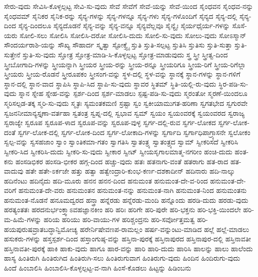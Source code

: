{ಸೇರು-ವುದು
ಸೇವಿಸಿ-ಕೊಳ್ಳಲ್ಪಟ್ಟ
ಸೇವಿ-ಸು-ವುದು
ಸೇವೆ
ಸೇವೆಗೆ
ಸೇವೆ-ಯನ್ನು
ಸೇವೆ-ಯಿಂದ
ಸೈಂಧವನ
ಸೈಂಧವ-ನನ್ನು
ಸೈಂಧವಮ್
ಸೈನಿಕರ
ಸೈನಿಕ-ರನ್ನು
ಸೈನ್ಯ-ಗಳನ್ನು
ಸೈನ್ಯ-ಗಳನ್ನೂ
ಸೈನ್ಯ-ಗಳು
ಸೈನ್ಯ-ಗಳೊಂದಿಗೆ
ಸೈನ್ಯದ
ಸೈನ್ಯ-ದಲ್ಲಿ
ಸೈನ್ಯ-ದಿಂದ
ಸೈನ್ಯ-ದಿಂದಲೂ
ಸೈನ್ಯದೊಡನೆ
ಸೈನ್ಯ-ವನ್ನು
ಸೈನ್ಯ-ವನ್ನೂ
ಸೈನ್ಯವೆಲ್ಲವೂ
ಸೈನ್ಯೈಃ
ಸೈರ್ಯಧೈರ್ಯ-ಗಳನ್ನು
ಸೊಸೆ-ಯರು
ಸೋಲಿ-ಸಲು
ಸೋಲಿಸಿ
ಸೋಲಿಸಿ-ದರೋ
ಸೋಲಿಸಿ-ದುದು
ಸೋಲಿ-ಸು-ವುದು
ಸೋಲು-ವುದು
ಸೋಽಸ್ಮಾನ್
ಸೌಂದರ್ಯರಾಶಿ-ಯನ್ನು
ಸೌಖ್ಯ
ಸೌಹಾರ್ದ
ಸ್ಕೃತ್ವಾ
ಸ್ಟೋಕ್ತ್ಯೈ
ಸ್ತುತಿ
ಸ್ತುತಿ-ಸಲ್ಪಟ್ಟ
ಸ್ತುತಿಸಿ
ಸ್ತುತಿಸು
ಸ್ತುತಿ-ಸುತ್ತಾ
ಸ್ತುತಿ-ಸುತ್ತೇನೆ
ಸ್ತುತಿ-ಸು-ವುದು
ಸ್ತೋತ್ರ
ಸ್ತೋತ್ರ-ಮಾಡಿ-ಸಿ-ಕೊಳ್ಳಲ್ಪಟ್ಟ
ಸ್ತೋತ್ರ-ಮಾಡುವುದು
ಸ್ತ್ರ
ಸ್ತ್ರೀ
ಸ್ತ್ರೀತ್ವ-ದಿಂದ
ಸ್ತ್ರೀಬೋಗಾದಿ-ಗಳನ್ನು
ಸ್ತ್ರೀಯನ್ನಾಗಿ
ಸ್ತ್ರೀಯರ
ಸ್ತ್ರೀಯ-ರನ್ನು
ಸ್ತ್ರೀಯ-ರನ್ನೂ
ಸ್ತ್ರೀಯರಿಗೂ
ಸ್ತ್ರೀಯ-ರಿಗೆ
ಸ್ತ್ರೀಯ-ರಿಗೆಲ್ಲಾ
ಸ್ತ್ರೀಯರು
ಸ್ತ್ರೀಯ-ರೊಡನೆ
ಸ್ತ್ರೀರೂಪಕಂ
ಸ್ತ್ರೀಸಂಗ-ವನ್ನು
ಸ್ಥಳ-ದಲ್ಲಿ
ಸ್ಥಳ-ವನ್ನು
ಸ್ಥಾನಕ್ಕೆ
ಸ್ಥಾನ-ಗಳನ್ನು
ಸ್ಥಾನ-ಗಳಿಗೆ
ಸ್ಥಾನ-ದಲ್ಲಿ
ಸ್ಥಾನ-ವಾದ
ಸ್ಥಾಪಿಸಿ
ಸ್ಥಾಪಿ-ಸಿದ
ಸ್ಥಾಪಿ-ಸು-ವುದು
ಸ್ಥಾವರ
ಸ್ಥಿತಮ್
ಸ್ಥಿತಿ-ಯಲ್ಲಿ-ರು-ವುದು
ಸ್ಥಿರ-ಪಡಿ-ಸು-ವುದು
ಸ್ನಾನ
ಸ್ನೇಹ
ಸ್ನೇಹ-ವನ್ನು
ಸ್ಪರ್ಶ-ದಿಂದ
ಸ್ಪರ್ಶ-ಮಾಡಲು
ಸ್ಪಷ್ಟ-ಪಡಿ-ಸು-ವುದು
ಸ್ಮರಂತೋ
ಸ್ಮರಣೆ-ಯಿಂದಲೂ
ಸ್ಮರಿಸಲ್ಪಡ-ತಕ್ಕ
ಸ್ಮರಿ-ಸು-ವುದು
ಸ್ಮೃತಃ
ಸ್ಯಮಂತಕಮಣಿ
ಸ್ರಷ್ಟಾ
ಸ್ವಂ
ಸ್ವಕೀಯಾಮುಗತ-ಹರಿಣಾ
ಸ್ವಗತಭೇದ
ಸ್ವಗುರವೇ
ಸ್ವಜನನೀಮಾನ್ಯಸ್ತೃಣಾ-ವರ್ತಹಾ
ಸ್ವತಂತ್ರ
ಸ್ವಪ್ನ-ದಲ್ಲಿ
ಸ್ವಭಾವ
ಸ್ವಮ್
ಸ್ವಯಂ
ಸ್ವಯಂವರಕ್ಕೆ
ಸ್ವಯಂವರದ
ಸ್ವರಾಜ್ಯ
ಸ್ವರಾಜ್ಯೇ
ಸ್ವರೂಪ
ಸ್ವರೂಪ-ಳಾದ
ಸ್ವರೂಪ-ವನ್ನು
ಸ್ವರೂಪ-ವುಳ್ಳ
ಸ್ವರ್ಗ-ದಲ್ಲಿ-ರುವ
ಸ್ವರ್ಗ-ಲೋಕದ
ಸ್ವರ್ಗ-ಲೋಕ-ದಂತೆ
ಸ್ವರ್ಗ-ಲೋಕ-ದಲ್ಲಿ
ಸ್ವರ್ಗ-ಲೋಕ-ದಿಂದ
ಸ್ವರ್ಗ-ಲೋಕಾದಿ-ಗಳನ್ನು
ಸ್ವರ್ಗಾದಿ
ಸ್ವರ್ಗಾಧಿಪಾಗ್ರ್ಯಾಸನೇ
ಸ್ವಲೋಕಂ
ಸ್ವಲ್ಪ-ವನ್ನು
ಸ್ವಸಹಜಾಂ
ಸ್ವಾಂ
ಸ್ವಾಂತಿಕಮಾ-ಗತಂ
ಸ್ವಾಗತಿಸಿ
ಸ್ವಾತಂತ್ರ್ಯ
ಸ್ವಾತಂತ್ರ್ಯದ
ಸ್ವಾಮ್
ಸ್ವೀಕರಿಸದೆ
ಸ್ವೀಕರಿಸಿ
ಸ್ವೀಕರಿ-ಸಿದ
ಸ್ವೀಕರಿಸಿ-ದುದು
ಸ್ವೀಕರಿ-ಸು-ವುದು
ಸ್ವೀಕಾರ
ಸ್ವೀಟ್
ಸ್ವೀಯಸೃಗಾಲಮಾತ್ಮ-ನಗರೀಂ
ಹಂಚಿ-ದುದು
ಹಂತ-ಕನು
ಹಂಸಡಿಭಿಕರ
ಹಂಸಡಿ-ಭೀಕರ
ಹಗ್ಗ-ದಿಂದ
ಹಚ್ಚು-ವುದು
ಹತಃ
ಹತನಾಗು-ವಂತೆ
ಹತರಾಗು
ಹತ-ರಾದ
ಹತ-ವಾದುವು
ಹತೇ
ಹತೇ-ಽರ್ಕಜೇ
ಹತ್ತು
ಹತ್ವಾ
ಹತ್ವೇಂದ್ರಾರಿ-ಕುಂಭ-ಕರ್ಣ-ದಶಕಾದೀನ್
ಹದಿನಾರು
ಹದಿ-ನಾಲ್ಕು
ಹದಿನೆಂಟು
ಹದಿನೈದು
ಹದಿ-ಮೂರು
ಹನನ
ಹನನ-ದಿಂದ
ಹನುಮಂತ
ಹನುಮಂತ-ದೇ-ವ-ರಿಂದ
ಹನುಮಂತ-ದೇ-ವರಿಗೆ
ಹನುಮಂತ-ದೇ-ವರು
ಹನುಮಂತನ
ಹನುಮಂತ-ನನ್ನು
ಹನುಮಂತ-ನಾಗಿ
ಹನುಮಂತ-ನಿಂದ
ಹನುಮಂತನು
ಹನುಮಂತ-ನೊಡನೆ
ಹನೂಮದ್ವರದ
ಹನ್ತ್ರಾ
ಹನ್ನೆರಡು
ಹನ್ನೆರಡು-ಮಂದಿ
ಹನ್ನೊಂದು
ಹರಡಿ-ದುದು
ಹರಡು-ವುದು
ಹರತ್ಯಂತತಃ
ಹರದನುರ್ಭಂಕ್ತ್ವಾಽವಹಜ್ಞಾನಕೀಂ
ಹರಿ
ಹರಿಃ
ಹರಿಗೇ
ಹರಿ-ಪುರೇ
ಹರಿ-ಭಕ್ತನು
ಹರಿ-ಭಕ್ತಿ-ಯಿಂದಲೇ
ಹರಿ-ಮ-ಹಿಮೆ-ಗಳನ್ನು
ಹರಿಯ
ಹರಿಯು
ಹರಿ-ವಾಯು-ಗಳ
ಹರಿಶ್ಚಂದ್ರನು
ಹರಿ-ಸರ್ವೋತ್ತಮತ್ವ
ಹರಿ-ಹಯಪುರುಷವ್ರಾತಬದ್ಧಾನ್ವಿಮೋಚ್ಯ
ಹರೇರ್ನಿಷೇವಣಪ-ರಾಮಲ್ಲಂ
ಹರ್ಷ-ವನ್ನುಂಟು-ಮಾಡಿದ
ಹಲ್ಲೆ
ಹಲ್ಲೆ-ಮಾಡಲು
ಹಸುಕರು-ಗಳನ್ನು
ಹಸ್ತಸ್ಪರ್ಶ-ದಿಂದ
ಹಸ್ತಾಂಗುಷ್ಠ-ವನ್ನು
ಹಸ್ತಿನಾ-ಪುರಕ್ಕೆ
ಹಸ್ತಿನಾಪುರದ
ಹಸ್ತಿನಾಪುರ-ದಲ್ಲಿ
ಹಸ್ತಿನಾವತೀ
ಹಸ್ತಿನಾವತೀ-ಪುರಕ್ಕೆ
ಹಾಕಿ
ಹಾಕು-ವುದು
ಹಾಗೂ
ಹಾರ-ವನ್ನು
ಹಾರಿ
ಹಾರಿ-ದುದು
ಹಾರಿಸಿ
ಹಾಲನ್ನು
ಹಾಲು
ಹಾಲೆಂದು
ಹಾಸ್ಯ
ಹಿಂತಿರುಗಿ
ಹಿಂತಿರುಗಿದ
ಹಿಂತಿರುಗಿ-ಸಲು
ಹಿಂತಿರುಗುವಾಗ
ಹಿಂತಿರುಗು-ವುದು
ಹಿಂದಿನ
ಹಿಂದಿರುಗು-ವುದು
ಹಿಂದೆ
ಹಿಂಬಾಲಿಸಿ
ಹಿಂಬಾಲಿಸಿ-ಕೊಳ್ಳಲ್ಪಟ್ಟ-ವ-ನಾಗಿ
ಹಿಂಸೆ-ಕೊಡಲು
ಹಿಟ್ಟನ್ನು
ಹಿಡಿಂಬನು
}

